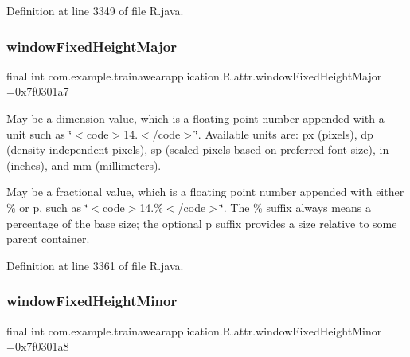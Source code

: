 Definition at line 3349 of file R.\+java.

\mbox{\label{classcom_1_1example_1_1trainawearapplication_1_1_r_1_1attr_a512535868802d6f5c9ae0bc248d87c84}} 
\subsubsection{\texorpdfstring{windowFixedHeightMajor}{windowFixedHeightMajor}}
{\footnotesize\ttfamily final int com.\+example.\+trainawearapplication.\+R.\+attr.\+window\+Fixed\+Height\+Major =0x7f0301a7\hspace{0.3cm}{\ttfamily [static]}}

May be a dimension value, which is a floating point number appended with a unit such as \char`\"{}$<$code$>$14.\+5sp$<$/code$>$\char`\"{}. Available units are\+: px (pixels), dp (density-\/independent pixels), sp (scaled pixels based on preferred font size), in (inches), and mm (millimeters). 

May be a fractional value, which is a floating point number appended with either \% or p, such as \char`\"{}$<$code$>$14.\%$<$/code$>$\char`\"{}. The \% suffix always means a percentage of the base size; the optional p suffix provides a size relative to some parent container. 

Definition at line 3361 of file R.\+java.

\mbox{\label{classcom_1_1example_1_1trainawearapplication_1_1_r_1_1attr_aa01d13f7fad760b1651198d67c0fb0df}} 
\subsubsection{\texorpdfstring{windowFixedHeightMinor}{windowFixedHeightMinor}}
{\footnotesize\ttfamily final int com.\+example.\+trainawearapplication.\+R.\+attr.\+window\+Fixed\+Height\+Minor =0x7f0301a8\hspace{0.3cm}{\ttfamily [static]}}

